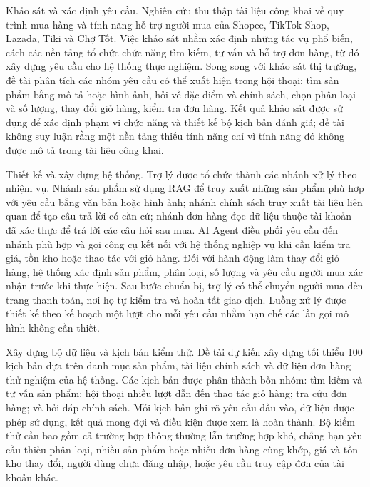 \documentclass[12pt,a4paper,oneside]{report}
\begin{document}
Khảo sát và xác định yêu cầu. Nghiên cứu thu thập tài liệu công khai về quy trình mua hàng và tính năng hỗ trợ người mua của Shopee, TikTok Shop, Lazada, Tiki và Chợ Tốt. Việc khảo sát nhằm xác định những tác vụ phổ biến, cách các nền tảng tổ chức chức năng tìm kiếm, tư vấn và hỗ trợ đơn hàng, từ đó xây dựng yêu cầu cho hệ thống thực nghiệm. Song song với khảo sát thị trường, đề tài phân tích các nhóm yêu cầu có thể xuất hiện trong hội thoại: tìm sản phẩm bằng mô tả hoặc hình ảnh, hỏi về đặc điểm và chính sách, chọn phân loại và số lượng, thay đổi giỏ hàng, kiểm tra đơn hàng. Kết quả khảo sát được sử dụng để xác định phạm vi chức năng và thiết kế bộ kịch bản đánh giá; đề tài không suy luận rằng một nền tảng thiếu tính năng chỉ vì tính năng đó không được mô tả trong tài liệu công khai.

Thiết kế và xây dựng hệ thống. Trợ lý được tổ chức thành các nhánh xử lý theo nhiệm vụ. Nhánh sản phẩm sử dụng RAG để truy xuất những sản phẩm phù hợp với yêu cầu bằng văn bản hoặc hình ảnh; nhánh chính sách truy xuất tài liệu liên quan để tạo câu trả lời có căn cứ; nhánh đơn hàng đọc dữ liệu thuộc tài khoản đã xác thực để trả lời các câu hỏi sau mua. AI Agent điều phối yêu cầu đến nhánh phù hợp và gọi công cụ kết nối với hệ thống nghiệp vụ khi cần kiểm tra giá, tồn kho hoặc thao tác với giỏ hàng. Đối với hành động làm thay đổi giỏ hàng, hệ thống xác định sản phẩm, phân loại, số lượng và yêu cầu người mua xác nhận trước khi thực hiện. Sau bước chuẩn bị, trợ lý có thể chuyển người mua đến trang thanh toán, nơi họ tự kiểm tra và hoàn tất giao dịch. Luồng xử lý được thiết kế theo kế hoạch một lượt cho mỗi yêu cầu nhằm hạn chế các lần gọi mô hình không cần thiết.

Xây dựng bộ dữ liệu và kịch bản kiểm thử. Đề tài dự kiến xây dựng tối thiểu 100 kịch bản dựa trên danh mục sản phẩm, tài liệu chính sách và dữ liệu đơn hàng thử nghiệm của hệ thống. Các kịch bản được phân thành bốn nhóm: tìm kiếm và tư vấn sản phẩm; hội thoại nhiều lượt dẫn đến thao tác giỏ hàng; tra cứu đơn hàng; và hỏi đáp chính sách. Mỗi kịch bản ghi rõ yêu cầu đầu vào, dữ liệu được phép sử dụng, kết quả mong đợi và điều kiện được xem là hoàn thành. Bộ kiểm thử cần bao gồm cả trường hợp thông thường lẫn trường hợp khó, chẳng hạn yêu cầu thiếu phân loại, nhiều sản phẩm hoặc nhiều đơn hàng cùng khớp, giá và tồn kho thay đổi, người dùng chưa đăng nhập, hoặc yêu cầu truy cập đơn của tài khoản khác.
\end{document}
